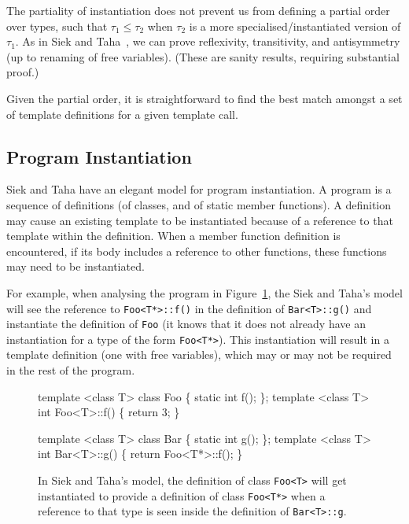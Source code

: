 \documentclass[11pt]{article}
\begin{document}
The partiality of instantiation does not prevent us from defining a
partial order over types, such that $\tau_1 \leq \tau_2$ when $\tau_2$
is a more specialised/instantiated version of $\tau_1$.  As in Siek
and Taha~\cite{DBLP:conf/ecoop/SiekT06}, we can prove reflexivity,
transitivity, and antisymmetry (up to renaming of free variables).
(These are sanity results, requiring substantial proof.)

Given the partial order, it is straightforward to find the best match
amongst a set of template definitions for a given template call.

\subsection{Program Instantiation}

Siek and Taha have an elegant model for program instantiation.  A
program is a sequence of definitions (of classes, and of static member
functions).  A definition may cause an existing template to be
instantiated because of a reference to that template within the
definition.  When a member function definition is encountered, if its
body includes a reference to other functions, these functions may need
to be instantiated.

For example, when analysing the program in Figure~\ref{fig:taha-prog},
the Siek and Taha's model will see the reference to
\texttt{Foo<T*>::f()} in the definition of \texttt{Bar<T>::g()} and
instantiate the definition of \texttt{Foo} (it knows that it does not
already have an instantiation for a type of the form \texttt{Foo<T*>}).
This instantiation will result in a template definition (one with free
variables), which may or may not be required in the rest of the
program.
\begin{figure}
\begin{stdrule}
   template <class T> class Foo \{ static int f(); \};
   template <class T> int Foo<T>::f() \{ return 3; \}

   template <class T> class Bar \{ static int g(); \};
   template <class T> int Bar<T>::g() \{ return Foo<T*>::f(); \}
\end{stdrule}
  \caption[A Template Program]{In Siek and Taha's model, the
    definition of class \texttt{Foo<T>} will get instantiated to
    provide a definition of class \texttt{Foo<T*>} when a reference to
    that type is seen inside the definition of \texttt{Bar<T>::g}.}
\label{fig:taha-prog}
\end{figure}
\end{document}
